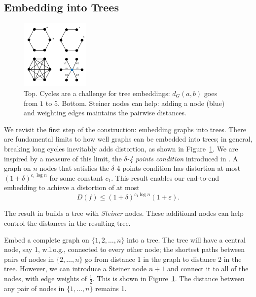 




\subsection{Embedding into Trees}
\begin{figure}
\centering
\includegraphics[width=0.3\textwidth]{figures/steiner.pdf}
\caption{Top. Cycles are a challenge for tree embeddings: $d_G(a,b)$ goes from $1$ to $5$. Bottom. Steiner nodes can help: adding a node (blue) and weighting edges maintains the pairwise distances.}
\label{fig:steiner}
\end{figure}
We revisit the first step of the construction: embedding graphs into
trees. There are fundamental limits to how well graphs can be embedded
into trees; in general, breaking long cycles inevitably adds
distortion, as shown in Figure~\ref{fig:steiner}. We are inspired by a
measure of this limit, the \emph{$\delta$-4 points condition} introduced
in \citet{Abraham}. A graph on $n$ nodes that satisfies the $\delta$-4
points condition has distortion at most $(1+\delta)^{c_1 \log n}$ for
some constant $c_1$. This result enables our end-to-end embedding to
achieve a distortion of at most \[D(f) \leq (1+\delta)^{c_1 \log n}(1
+ \varepsilon).\]

The result in \citet{Abraham} builds a tree with \emph{Steiner} nodes. These additional nodes can help control the distances in the resulting tree.
\begin{example} \label{ex:steiner}
Embed a complete graph on $\{1,2,\ldots, n\}$ into a tree. The tree will have a central node, say 1, w.l.o.g., connected to every other node; the shortest paths between pairs of nodes in $\{2,\ldots,n\}$ go from distance 1 in the graph to distance 2 in the tree. However, we can introduce a Steiner node $n+1$ and connect it to all of the nodes, with edge weights of $\frac{1}{2}$. This is shown in Figure~\ref{fig:steiner}. The distance between any pair of nodes in $\{1,\ldots,n\}$ remains 1.\end{example}

